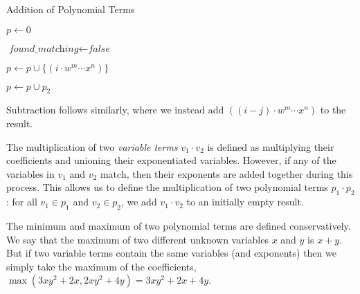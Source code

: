 \begin{algorithm}[hbt!]
  \caption{Addition of Polynomial Terms}\label{alg:two}

  \BlankLine

  \( p \gets 0 \)\;

  \BlankLine

   {

    \BlankLine

    \( \textit{found\_matching} \gets \textit{false} \)\;

    \BlankLine

     {
    }
     {
      \( p \gets p \cup \{ (i \cdot w^m \cdots x^n) \} \)\;
    }
  }

  \( p \gets p \cup p_2 \)\;

\end{algorithm}

Subtraction follows similarly, where we instead add \( ((i - j) \cdot w^m \cdots x^n) \) to the result.

The multiplication of two \textit{variable terms} \( v_1 \cdot v_2 \) is defined as multiplying their coefficients and unioning their exponentiated variables. However, if any of the variables in \( v_1 \) and \( v_2 \) match, then their exponents are added together during this process. This allows us to define the multiplication of two polynomial terms \( p_1 \cdot p_2 \): for all \( v_1 \in p_1 \) and \( v_2 \in p_2 \), we add \( v_1 \cdot v_2 \) to an initially empty result.

The minimum and maximum of two polynomial terms are defined conservatively. We say that the maximum of two different unknown variables \( x \) and \( y \) is \( x + y \). But if two variable terms contain the same variables (and exponents) then we simply take the maximum of the coefficients, \( {\max(3xy^2 + 2x, 2xy^2 + 4y) = 3xy^2 + 2x + 4y} \).

